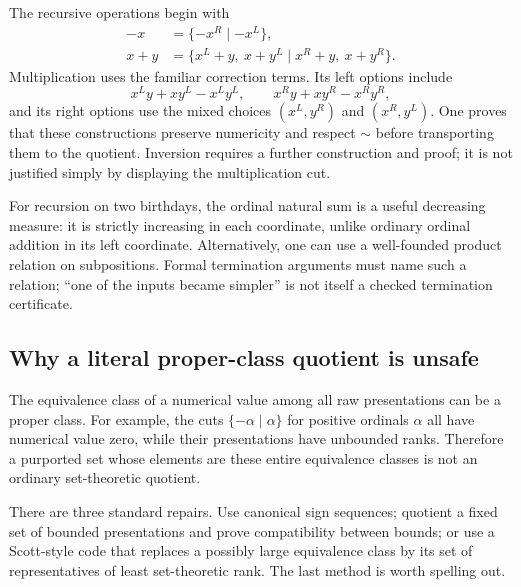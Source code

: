\documentclass[11pt,letterpaper]{article}
\numberwithin{equation}{section}
\theoremstyle{definition}
\theoremstyle{remark}
\begin{document}
The recursive operations begin with
\begin{align*}
-x&=\{-x^R\mid -x^L\},\\
x+y&=\{x^L+y,\ x+y^L\mid x^R+y,\ x+y^R\}.
\end{align*}
Multiplication uses the familiar correction terms. Its left options include
\[
x^Ly+xy^L-x^Ly^L,\qquad x^Ry+xy^R-x^Ry^R,
\]
and its right options use the mixed choices $(x^L,y^R)$ and $(x^R,y^L)$. One proves that these constructions preserve numericity and respect $\sim$ before transporting them to the quotient. Inversion requires a further construction and proof; it is not justified simply by displaying the multiplication cut.

For recursion on two birthdays, the ordinal natural sum is a useful decreasing measure: it is strictly increasing in each coordinate, unlike ordinary ordinal addition in its left coordinate. Alternatively, one can use a well-founded product relation on subpositions. Formal termination arguments must name such a relation; ``one of the inputs became simpler'' is not itself a checked termination certificate.

\subsection{Why a literal proper-class quotient is unsafe}
The equivalence class of a numerical value among all raw presentations can be a proper class. For example, the cuts $\{-\alpha\mid\alpha\}$ for positive ordinals $\alpha$ all have numerical value zero, while their presentations have unbounded ranks. Therefore a purported set whose elements are these entire equivalence classes is not an ordinary set-theoretic quotient.

There are three standard repairs. Use canonical sign sequences; quotient a fixed set of bounded presentations and prove compatibility between bounds; or use a Scott-style code that replaces a possibly large equivalence class by its set of representatives of least set-theoretic rank. The last method is worth spelling out.
\end{document}
